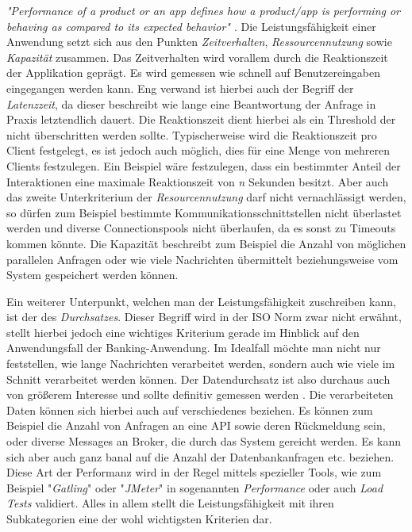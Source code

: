\emph{"Performance of a product or an app defines how a product/app is performing or behaving as compared to its expected behavior" \cite{nfr-dotnetcurry}}. Die Leistungsfähigkeit einer Anwendung setzt sich aus den Punkten \emph{Zeitverhalten}, \emph{Ressourcennutzung} sowie \emph{Kapazität} zusammen. Das Zeitverhalten wird vorallem durch die Reaktionszeit der Applikation geprägt. Es wird gemessen wie schnell auf Benutzereingaben eingegangen werden kann. Eng verwand ist hierbei auch der Begriff der \emph{Latenzzeit}, da dieser beschreibt wie lange eine Beantwortung der Anfrage in Praxis letztendlich dauert. Die Reaktionszeit dient hierbei als ein Threshold der nicht überschritten werden sollte. Typischerweise wird die Reaktionszeit pro Client festgelegt, es ist jedoch auch möglich, dies für eine Menge von mehreren Clients festzulegen. Ein Beispiel wäre festzulegen, dass ein bestimmter Anteil der Interaktionen eine maximale Reaktionszeit von \emph{n} Sekunden besitzt. Aber auch das zweite Unterkriterium der \emph{Resourcennutzung} darf nicht vernachlässigt werden, so dürfen zum Beispiel bestimmte Kommunikationsschnittstellen nicht überlastet werden und diverse Connectionspools nicht überlaufen, da es sonst zu Timeouts kommen könnte. Die Kapazität beschreibt zum Beispiel die Anzahl von möglichen parallelen Anfragen oder wie viele Nachrichten übermittelt beziehungsweise vom System gespeichert werden können. 

Ein weiterer Unterpunkt, welchen man der Leistungsfähigkeit zuschreiben kann, ist der des \emph{Durchsatzes}. Dieser Begriff wird in der ISO Norm zwar nicht erwähnt, stellt hierbei jedoch eine wichtiges Kriterium gerade im Hinblick auf den Anwendungsfall der Banking-Anwendung. Im Idealfall möchte man nicht nur feststellen, wie lange Nachrichten verarbeitet werden, sondern auch wie viele im Schnitt verarbeitet werden können. Der Datendurchsatz ist also durchaus auch von größerem Interesse und sollte definitiv gemessen werden . Die verarbeiteten Daten können sich hierbei auch auf verschiedenes beziehen. Es können zum Beispiel die Anzahl von Anfragen an eine API sowie deren Rückmeldung sein, oder diverse Messages an Broker, die durch das System gereicht werden. Es kann sich aber auch ganz banal auf die Anzahl der Datenbankanfragen etc. beziehen. Diese Art der Performanz wird in der Regel mittels spezieller Tools, wie zum Beispiel "\emph{Gatling}" oder  "\emph{JMeter}" in sogenannten \emph{Performance} oder auch \emph{Load Tests} validiert. Alles in allem stellt die Leistungsfähigkeit mit ihren Subkategorien eine der wohl wichtigsten Kriterien dar. 


